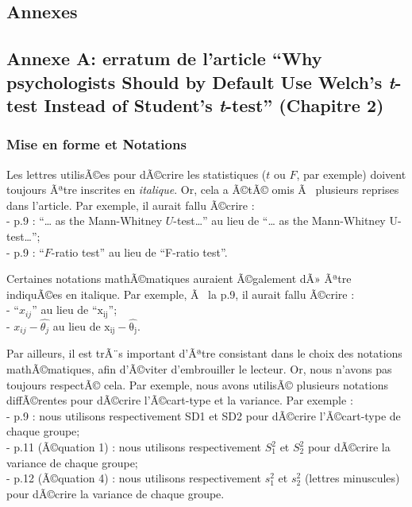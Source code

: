 \clearpage



\begin{appendix}
\hypertarget{annexes}{%
\section{Annexes}\label{annexes}}

\hypertarget{annexe-a-erratum-de-larticle-why-psychologists-should-by-default-use-welchs-t-test-instead-of-students-t-test-chapitre-2}{%
\subsection{\texorpdfstring{Annexe A: erratum de l'article ``Why
psychologists Should by Default Use Welch's \emph{t}-test Instead of
Student's \emph{t}-test'' (Chapitre
2)}{Annexe A: erratum de l'article ``Why psychologists Should by Default Use Welch's t-test Instead of Student's t-test'' (Chapitre 2)}}\label{annexe-a-erratum-de-larticle-why-psychologists-should-by-default-use-welchs-t-test-instead-of-students-t-test-chapitre-2}}

\hypertarget{mise-en-forme-et-notations}{%
\subsubsection{Mise en forme et
Notations}\label{mise-en-forme-et-notations}}

Les lettres utilisÃ©es pour dÃ©crire les statistiques (\(t\) ou \(F\),
par exemple) doivent toujours Ãªtre inscrites en \emph{italique}. Or,
cela a Ã©tÃ© omis Ã~ plusieurs reprises dans l'article. Par exemple, il
aurait fallu Ã©crire :\\
- p.9 : ``\ldots{} as the Mann-Whitney \(U\)-test\ldots{}'' au lieu de
``\ldots{} as the Mann-Whitney U-test\ldots{}'';\\
- p.9 : ``\(F\)-ratio test'' au lieu de ``F-ratio test''.

Certaines notations mathÃ©matiques auraient Ã©galement dÃ» Ãªtre
indiquÃ©es en italique. Par exemple, Ã~ la p.9, il aurait fallu Ã©crire
:\\
- ``\(x_{ij}\)'' au lieu de ``\(\mathrm{x_{ij}}\)'';\\
- \textbar{}\(x_{ij}-\hat{\theta_j}\)\textbar{} au lieu de
\textbar{}\(\mathrm{x_{ij}-\hat{\theta_j}}\)\textbar.

Par ailleurs, il est trÃ¨s important d'Ãªtre consistant dans le choix
des notations mathÃ©matiques, afin d'Ã©viter d'embrouiller le lecteur.
Or, nous n'avons pas toujours respectÃ© cela. Par exemple, nous avons
utilisÃ© plusieurs notations diffÃ©rentes pour dÃ©crire l'Ã©cart-type et
la variance. Par exemple :\\
- p.9 : nous utilisons respectivement SD1 et SD2 pour dÃ©crire
l'Ã©cart-type de chaque groupe;\\
- p.11 (Ã©quation 1) : nous utilisons respectivement \(S^2_1\) et
\(S^2_2\) pour dÃ©crire la variance de chaque groupe;\\
- p.12 (Ã©quation 4) : nous utilisons respectivement \(s^2_1\) et
\(s^2_2\) (lettres minuscules) pour dÃ©crire la variance de chaque
groupe.


\end{appendix}
